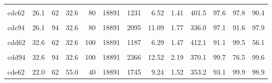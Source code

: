 \begin{landscape}
\begin{longtable}[t]{lrrrrrrrrrrrr}
\cellcolor{gray!6}{cdc46} & \cellcolor{gray!6}{26.1} & \cellcolor{gray!6}{46} & \cellcolor{gray!6}{32.6} & \cellcolor{gray!6}{80} & \cellcolor{gray!6}{18894} & \cellcolor{gray!6}{1642} & \cellcolor{gray!6}{8.69} & \cellcolor{gray!6}{1.31} & \cellcolor{gray!6}{401.9} & \cellcolor{gray!6}{88.8} & \cellcolor{gray!6}{95.8} & \cellcolor{gray!6}{66.6}\\
cdc62 & 26.1 & 62 & 32.6 & 80 & 18891 & 1231 & 6.52 & 1.41 & 401.5 & 97.6 & 97.8 & 90.4\\
\cellcolor{gray!6}{cdc78} & \cellcolor{gray!6}{26.1} & \cellcolor{gray!6}{78} & \cellcolor{gray!6}{32.6} & \cellcolor{gray!6}{80} & \cellcolor{gray!6}{18891} & \cellcolor{gray!6}{1783} & \cellcolor{gray!6}{9.44} & \cellcolor{gray!6}{1.40} & \cellcolor{gray!6}{333.5} & \cellcolor{gray!6}{99.2} & \cellcolor{gray!6}{96.5} & \cellcolor{gray!6}{96.5}\\
cdc94 & 26.1 & 94 & 32.6 & 80 & 18891 & 2095 & 11.09 & 1.77 & 336.0 & 97.1 & 91.6 & 97.9\\
\cellcolor{gray!6}{cdd46} & \cellcolor{gray!6}{32.6} & \cellcolor{gray!6}{46} & \cellcolor{gray!6}{32.6} & \cellcolor{gray!6}{100} & \cellcolor{gray!6}{18891} & \cellcolor{gray!6}{911} & \cellcolor{gray!6}{4.82} & \cellcolor{gray!6}{1.14} & \cellcolor{gray!6}{440.4} & \cellcolor{gray!6}{82.1} & \cellcolor{gray!6}{99.5} & \cellcolor{gray!6}{52.1}\\
cdd62 & 32.6 & 62 & 32.6 & 100 & 18891 & 1187 & 6.29 & 1.47 & 412.1 & 91.1 & 99.5 & 56.1\\
\cellcolor{gray!6}{cdd78} & \cellcolor{gray!6}{32.6} & \cellcolor{gray!6}{78} & \cellcolor{gray!6}{32.6} & \cellcolor{gray!6}{100} & \cellcolor{gray!6}{18891} & \cellcolor{gray!6}{1671} & \cellcolor{gray!6}{8.84} & \cellcolor{gray!6}{1.46} & \cellcolor{gray!6}{413.3} & \cellcolor{gray!6}{96.2} & \cellcolor{gray!6}{96.5} & \cellcolor{gray!6}{81.1}\\
cdd94 & 32.6 & 94 & 32.6 & 100 & 18891 & 2366 & 12.52 & 2.19 & 370.1 & 99.7 & 76.5 & 99.6\\
\cellcolor{gray!6}{cde46} & \cellcolor{gray!6}{22.0} & \cellcolor{gray!6}{46} & \cellcolor{gray!6}{55.0} & \cellcolor{gray!6}{40} & \cellcolor{gray!6}{18891} & \cellcolor{gray!6}{1294} & \cellcolor{gray!6}{6.85} & \cellcolor{gray!6}{1.16} & \cellcolor{gray!6}{362.8} & \cellcolor{gray!6}{99.1} & \cellcolor{gray!6}{99.6} & \cellcolor{gray!6}{86.6}\\
cde62 & 22.0 & 62 & 55.0 & 40 & 18891 & 1745 & 9.24 & 1.52 & 353.2 & 93.1 & 99.9 & 98.9\\

\end{longtable}
\end{landscape}
